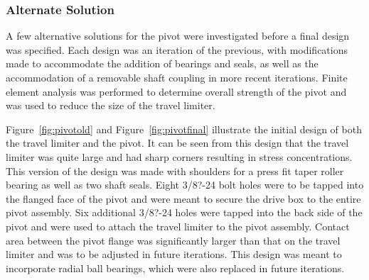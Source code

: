 \subsubsection{Alternate Solution}

A few alternative solutions for the pivot were investigated before a final design was specified. Each design was an iteration of the previous, with modifications made to accommodate the addition of bearings and seals, as well as the accommodation of a removable shaft coupling in more recent iterations. Finite element analysis was performed to determine overall strength of the pivot and was used to reduce the size of the travel limiter.

Figure~\ref{fig:pivotold} and Figure~\ref{fig:pivotfinal} illustrate the initial design of both the travel limiter and the pivot. It can be seen from this design that the travel limiter was quite large and had sharp corners resulting in stress concentrations. This version of the design was made with shoulders for a press fit taper roller bearing as well as two shaft seals. Eight 3/8?-24 bolt holes were to be tapped into the flanged face of the pivot and were meant to secure the drive box to the entire pivot assembly. Six additional 3/8?-24 holes were tapped into the back side of the pivot and were used to attach the travel limiter to the pivot assembly. Contact area between the pivot flange was significantly larger than that on the travel limiter and was to be adjusted in future iterations. This design was meant to incorporate radial ball bearings, which were also replaced in future iterations.


